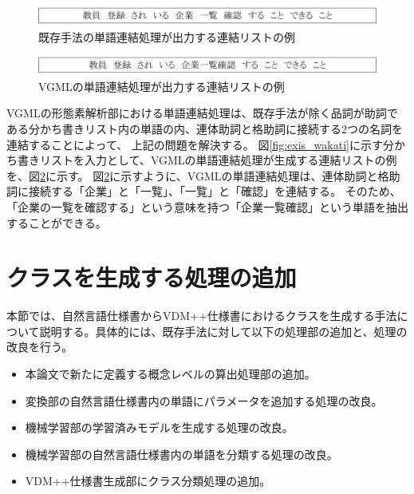 \begin{figure}[t]
    \begin{center}
        \includegraphics[width=1.0\columnwidth]{image/exis_connect.png}
        \caption{既存手法の単語連結処理が出力する連結リストの例}
        \label{fig:exis_connect}
    \end{center}
\end{figure}

\begin{figure}[t]
    \begin{center}
        \includegraphics[width=1.0\columnwidth]{image/vgml_connect.png}
        \caption{VGMLの単語連結処理が出力する連結リストの例}
        \label{fig:vgml_connect}
    \end{center}
\end{figure}

VGMLの形態素解析部における単語連結処理は、既存手法が除く品詞が助詞である分かち書きリスト内の単語の内、連体助詞と格助詞に接続する2つの名詞を連結することによって、
上記の問題を解決する。
図\ref{fig:exis_wakati}に示す分かち書きリストを入力として、VGMLの単語連結処理が生成する連結リストの例を、図\ref{fig:vgml_connect}に示す。
図\ref{fig:vgml_connect}に示すように、VGMLの単語連結処理は、連体助詞と格助詞に接続する「企業」と「一覧」、「一覧」と「確認」を連結する。
そのため、「企業の一覧を確認する」という意味を持つ「企業一覧確認」という単語を抽出することができる。

\section{クラスを生成する処理の追加}
\label{sec:generate_class}
本節では、自然言語仕様書からVDM++仕様書におけるクラスを生成する手法について説明する。具体的には、既存手法に対して以下の処理部の追加と、処理の改良を行う。

\begin{itemize}
    \item 本論文で新たに定義する概念レベルの算出処理部の追加。
    \item 変換部の自然言語仕様書内の単語にパラメータを追加する処理の改良。
    \item 機械学習部の学習済みモデルを生成する処理の改良。
    \item 機械学習部の自然言語仕様書内の単語を分類する処理の改良。
    \item VDM++仕様書生成部にクラス分類処理の追加。
\end{itemize}

